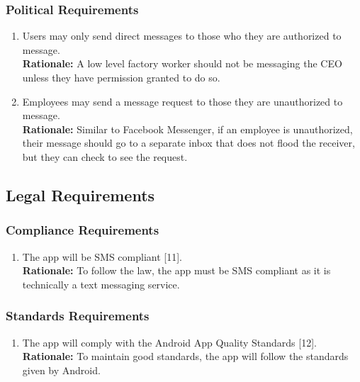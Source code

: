 \documentclass[]{article}
\begin{document}
\subsubsection{Political Requirements}
\label{ssub:political_requirements}
\begin{enumerate}[{CP-P}1. ]
	\item Users may only send direct messages to those who they are authorized to message.
	      \\\textbf{Rationale:} A low level factory worker should not be messaging the CEO unless they have permission granted to do so.
	\item Employees may send a message request to those they are unauthorized to message.
	      \\\textbf{Rationale:} Similar to Facebook Messenger, if an employee is unauthorized, their message should go to a separate inbox that does not flood the receiver, but they can check to see the request.
\end{enumerate}


\subsection{Legal Requirements}
\label{sub:legal_requirements}

\subsubsection{Compliance Requirements}
\label{ssub:compliance_requirements}
\begin{enumerate}[{LR-COMP}1. ]
	\item The app will be SMS compliant [11].
	      \\\textbf{Rationale:} To follow the law, the app must be SMS compliant as it is technically a text messaging service.
\end{enumerate}

\subsubsection{Standards Requirements}
\label{ssub:standards_requirements}
\begin{enumerate}[{LR-STD}1. ]
	\item The app will comply with the Android App Quality Standards [12].
	      \\\textbf{Rationale:} To maintain good standards, the app will follow the standards given by Android.
\end{enumerate}
\end{document}
